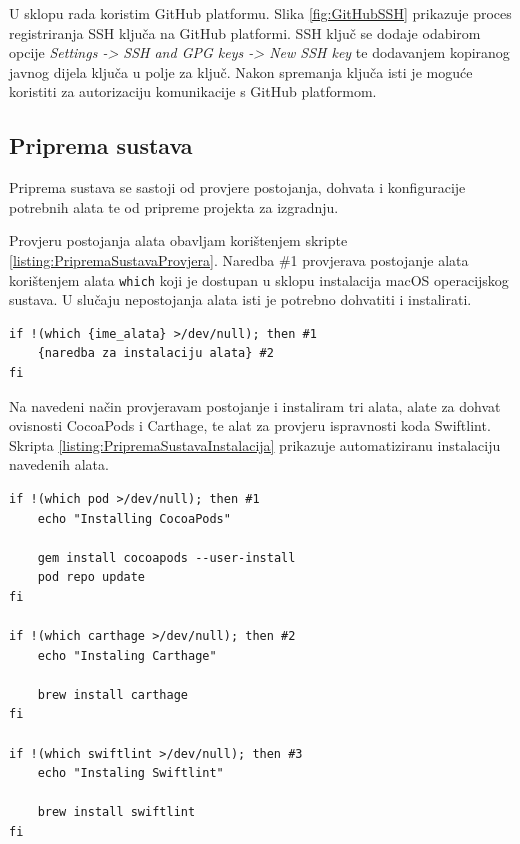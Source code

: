 \documentclass[times, utf8, diplomski, numeric]{fer}
\begin{document}
U sklopu rada koristim GitHub platformu. Slika \ref{fig:GitHubSSH} prikazuje proces registriranja SSH ključa na GitHub platformi. SSH ključ se dodaje odabirom opcije \textit{Settings -> SSH and GPG keys -> New SSH key} te dodavanjem kopiranog javnog dijela ključa u polje za ključ. Nakon spremanja ključa isti je moguće koristiti za autorizaciju komunikacije s GitHub platformom.


\subsection{Priprema sustava} \label{header:PripremaSustava}

Priprema sustava se sastoji od provjere postojanja, dohvata i konfiguracije potrebnih alata te od pripreme projekta za izgradnju.

Provjeru postojanja alata obavljam korištenjem skripte \ref{listing:PripremaSustavaProvjera}. Naredba \#1 provjerava postojanje alata korištenjem alata \verb|which| koji je dostupan u sklopu instalacija macOS operacijskog sustava. U slučaju nepostojanja alata isti je potrebno dohvatiti i instalirati.

\begin{lstlisting}[caption=Provjera postojanja alata, label=listing:PripremaSustavaProvjera]
if !(which {ime_alata} >/dev/null); then #1
    {naredba za instalaciju alata} #2
fi
\end{lstlisting}

Na navedeni način provjeravam postojanje i instaliram tri alata, alate za dohvat ovisnosti CocoaPods i Carthage, te alat za provjeru ispravnosti koda Swiftlint. Skripta \ref{listing:PripremaSustavaInstalacija} prikazuje automatiziranu instalaciju navedenih alata.


\begin{lstlisting}[caption=Automatizirana instalacija alata, label=listing:PripremaSustavaInstalacija]
if !(which pod >/dev/null); then #1
    echo "Installing CocoaPods"

    gem install cocoapods --user-install
    pod repo update
fi

if !(which carthage >/dev/null); then #2
    echo "Instaling Carthage"

    brew install carthage
fi

if !(which swiftlint >/dev/null); then #3
    echo "Instaling Swiftlint"

    brew install swiftlint
fi
\end{lstlisting}
\end{document}
